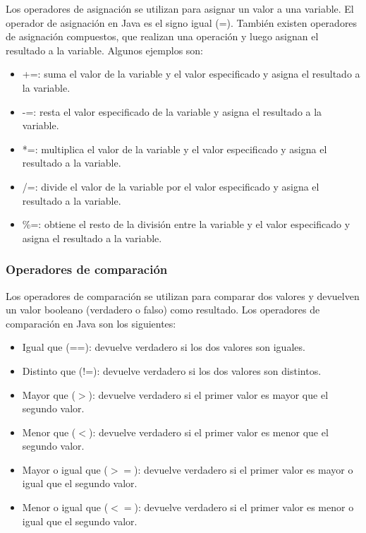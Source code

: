 \documentclass{article}
\begin{document}
Los operadores de asignación se utilizan para asignar un valor a una variable. El operador de asignación en Java es el signo igual (=). También existen operadores de asignación compuestos, que realizan una operación y luego asignan el resultado a la variable. Algunos ejemplos son:

\begin{itemize}
\item +=: suma el valor de la variable y el valor especificado y asigna el resultado a la variable.
\item -=: resta el valor especificado de la variable y asigna el resultado a la variable.
\item *=: multiplica el valor de la variable y el valor especificado y asigna el resultado a la variable.
\item /=: divide el valor de la variable por el valor especificado y asigna el resultado a la variable.
\item \%=: obtiene el resto de la división entre la variable y el valor especificado y asigna el resultado a la variable.
\end{itemize}

\subsubsection*{Operadores de comparación}

Los operadores de comparación se utilizan para comparar dos valores y devuelven un valor booleano (verdadero o falso) como resultado. Los operadores de comparación en Java son los siguientes:

\begin{itemize}
\item Igual que (==): devuelve verdadero si los dos valores son iguales.
\item Distinto que (!=): devuelve verdadero si los dos valores son distintos.
\item Mayor que ($>$): devuelve verdadero si el primer valor es mayor que el segundo valor.
\item Menor que ($<$): devuelve verdadero si el primer valor es menor que el segundo valor.
\item Mayor o igual que ($>=$): devuelve verdadero si el primer valor es mayor o igual que el segundo valor.
\item Menor o igual que ($<=$): devuelve verdadero si el primer valor es menor o igual que el segundo valor.
\end{itemize}
\end{document}
